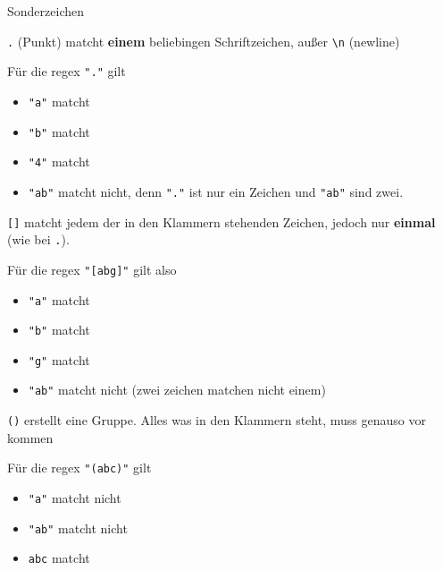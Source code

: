 \documentclass[ignorenonframetext,]{beamer}
\providecommand{\tightlist}{%
  \setlength{\itemsep}{0pt}\setlength{\parskip}{0pt}}
\begin{document}
\begin{frame}{Sonderzeichen}

\texttt{.} (Punkt) matcht \textbf{einem} beliebingen Schriftzeichen,
außer \texttt{\textbackslash{}n} (newline)

Für die regex \texttt{"."} gilt

\begin{itemize}
\tightlist
\item
  \texttt{"a"} matcht
\item
  \texttt{"b"} matcht
\item
  \texttt{"4"} matcht
\item
  \texttt{"ab"} matcht nicht, denn \texttt{"."} ist nur ein Zeichen und
  \texttt{"ab"} sind zwei.
\end{itemize}

\end{frame}

\begin{frame}

\texttt{{[}{]}} matcht jedem der in den Klammern stehenden Zeichen,
jedoch nur \textbf{einmal} (wie bei \texttt{.}).

Für die regex \texttt{"{[}abg{]}"} gilt also

\begin{itemize}
\tightlist
\item
  \texttt{"a"} matcht
\item
  \texttt{"b"} matcht
\item
  \texttt{"g"} matcht
\item
  \texttt{"ab"} matcht nicht (zwei zeichen matchen nicht einem)
\end{itemize}

\end{frame}

\begin{frame}

\texttt{()} erstellt eine Gruppe. Alles was in den Klammern steht, muss
genauso vor kommen

Für die regex \texttt{"(abc)"} gilt

\begin{itemize}
\tightlist
\item
  \texttt{"a"} matcht nicht
\item
  \texttt{"ab"} matcht nicht
\item
  \texttt{\textquotesingle{}abc\textquotesingle{}} matcht
\end{itemize}

\end{frame}
\end{document}
